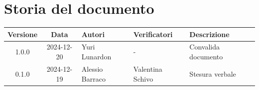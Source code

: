 \section*{Storia del documento}
\begin{tabularx}{\textwidth}{ c c p{2.75cm} p{2.75cm} X }
    \rowcolor{gray!20}\rule{0pt}{0.5cm}\textbf{Versione} & \textbf{Data} & \textbf{Autori} & \textbf{Verificatori} & \textbf{Descrizione} \\[0.7ex]
    \hline
    \rule{0pt}{0.5cm}1.0.0 & 2024-12-20 & Yuri Lunardon & - & Convalida documento\\[0.7ex]
    \hline
    \rule{0pt}{0.5cm}0.1.0 & 2024-12-19 & Alessio Barraco & Valentina Schivo & Stesura verbale\\[0.7ex]
\end{tabularx}
